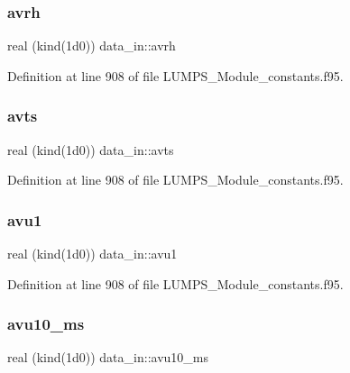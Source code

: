 \mbox{\label{namespacedata__in_a2c6cba95e27ebb1dcb673c457b66325d}} 
\subsubsection{\texorpdfstring{avrh}{avrh}}
{\footnotesize\ttfamily real (kind(1d0)) data\+\_\+in\+::avrh}



Definition at line 908 of file L\+U\+M\+P\+S\+\_\+\+Module\+\_\+constants.\+f95.

\mbox{\label{namespacedata__in_ab6a63bf1eb3d5838645b22b8f26bc97c}} 
\subsubsection{\texorpdfstring{avts}{avts}}
{\footnotesize\ttfamily real (kind(1d0)) data\+\_\+in\+::avts}



Definition at line 908 of file L\+U\+M\+P\+S\+\_\+\+Module\+\_\+constants.\+f95.

\mbox{\label{namespacedata__in_abc95201410a9b25f8d1d2d5a063302c3}} 
\subsubsection{\texorpdfstring{avu1}{avu1}}
{\footnotesize\ttfamily real (kind(1d0)) data\+\_\+in\+::avu1}



Definition at line 908 of file L\+U\+M\+P\+S\+\_\+\+Module\+\_\+constants.\+f95.

\mbox{\label{namespacedata__in_ad753c5f26f6cfaac607edf93d4c2dd1d}} 
\subsubsection{\texorpdfstring{avu10\+\_\+ms}{avu10\_ms}}
{\footnotesize\ttfamily real (kind(1d0)) data\+\_\+in\+::avu10\+\_\+ms}



